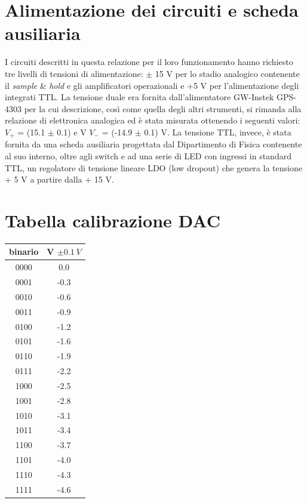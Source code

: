 \documentclass[journal]{IEEEtran}
\begin{document}
\begin{appendices}
\section{Alimentazione dei circuiti e scheda ausiliaria}
I circuiti descritti in questa relazione per il loro funzionamento hanno richiesto tre livelli di tensioni di alimentazione: $\pm$ 15 V per lo stadio analogico contenente il \textit{sample} \& \textit{hold} e gli amplificatori operazionali e +5 V per l'alimentazione degli integrati TTL. La tensione duale era fornita dall'alimentatore GW-Instek GPS-4303 per la cui descrizione, così come quella degli altri strumenti, si rimanda alla relazione di elettronica analogica ed è stata misurata ottenendo i seguenti valori: $V_+$ = (15.1 $\pm$ 0.1) e V $V_-$ = (-14.9 $\pm$ 0.1) V. La tensione TTL, invece, è stata fornita da una scheda ausiliaria progettata dal Dipartimento di Fisica contenente al suo interno, oltre agli switch e ad una serie di LED con ingressi in standard TTL, un regolatore di tensione lineare LDO (low dropout) che genera la tensione + 5 V a partire dalla + 15 V.

\section{Tabella calibrazione DAC}

\centering
\begin{tabular}{cc}
binario & V $ \pm 0.1 \ V $ \\ \hline
0000    & 0.0                          \\
0001    & -0.3                       \\
0010    & -0.6                       \\
0011    & -0.9                       \\
0100    & -1.2                       \\
0101    & -1.6                       \\
0110    & -1.9                       \\
0111    & -2.2                       \\
1000    & -2.5                       \\
1001    & -2.8                       \\
1010    & -3.1                       \\
1011    & -3.4                       \\
1100    & -3.7                       \\
1101    & -4.0                       \\
1110    & -4.3                       \\
1111    & -4.6
\vspace{5 mm}
\label{tab:calibrazione_dac}
\end{tabular}



\end{appendices}
\end{document}
